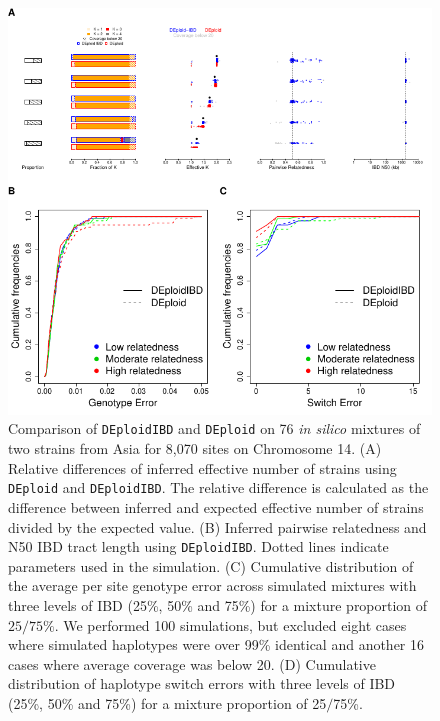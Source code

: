 \documentclass[9pt,lineno]{elife}
\begin{document}
\begin{figure}[htp]
  \begin{center}
  \includegraphics[width=.9\textwidth]{Fig2.pdf}
  \caption{Comparison of \texttt{DEploidIBD} and \texttt{DEploid}  on 76 {\it in silico} mixtures of two strains from Asia for 8,070 sites on Chromosome 14. (A) Relative differences of inferred effective number of strains using \texttt{DEploid} and \texttt{DEploidIBD}. The relative difference is calculated as the difference between inferred and expected effective number of strains divided by the expected value. (B) Inferred pairwise relatedness and N50 IBD tract length using \texttt{DEploidIBD}. Dotted lines indicate parameters used in the simulation. (C) Cumulative distribution of the average per site genotype error across simulated mixtures with three levels of IBD (25\%, 50\% and 75\%) for a mixture proportion of $25/75\%$. We performed 100 simulations, but excluded eight cases where simulated haplotypes were over 99\% identical and another 16 cases where average coverage was below 20.  (D) Cumulative distribution of haplotype switch errors with three levels of IBD (25\%, 50\% and 75\%) for a mixture proportion of 25$\slash$75\%.
  }\label{fig:benchmark}
  \end{center}


\end{figure}
\end{document}
